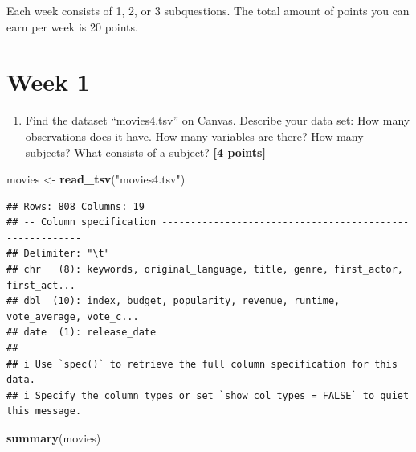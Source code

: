 \documentclass[
]{article}
\newenvironment{Shaded}{\begin{snugshade}}{\end{snugshade}}
\newcommand{\FunctionTok}[1]{\textcolor[rgb]{0.13,0.29,0.53}{\textbf{#1}}}
\newcommand{\NormalTok}[1]{#1}
\newcommand{\OtherTok}[1]{\textcolor[rgb]{0.56,0.35,0.01}{#1}}
\newcommand{\StringTok}[1]{\textcolor[rgb]{0.31,0.60,0.02}{#1}}
\providecommand{\tightlist}{%
  \setlength{\itemsep}{0pt}\setlength{\parskip}{0pt}}
\begin{document}
Each week consists of 1, 2, or 3 subquestions. The total amount of
points you can earn per week is 20 points.

\section{Week 1}\label{week-1}

\begin{enumerate}
\def\labelenumi{\arabic{enumi}.}
\tightlist
\item
  Find the dataset ``movies4.tsv'' on Canvas. Describe your data set:
  How many observations does it have. How many variables are there? How
  many subjects? What consists of a subject? \textbf{[4 points]}
\end{enumerate}

\begin{Shaded}
\begin{Highlighting}[]
\NormalTok{movies }\OtherTok{\textless{}{-}} \FunctionTok{read\_tsv}\NormalTok{(}\StringTok{"movies4.tsv"}\NormalTok{)}
\end{Highlighting}
\end{Shaded}

\begin{verbatim}
## Rows: 808 Columns: 19
## -- Column specification --------------------------------------------------------
## Delimiter: "\t"
## chr   (8): keywords, original_language, title, genre, first_actor, first_act...
## dbl  (10): index, budget, popularity, revenue, runtime, vote_average, vote_c...
## date  (1): release_date
## 
## i Use `spec()` to retrieve the full column specification for this data.
## i Specify the column types or set `show_col_types = FALSE` to quiet this message.
\end{verbatim}

\begin{Shaded}
\begin{Highlighting}[]
\FunctionTok{summary}\NormalTok{(movies)}
\end{Highlighting}
\end{Shaded}
\end{document}
